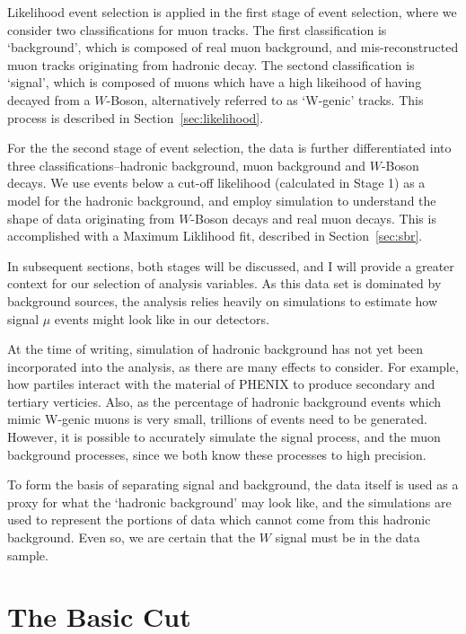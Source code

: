 Likelihood event selection is applied in the first stage of event selection,
where we consider two classifications for muon tracks. The first classification
is `background', which is composed of real muon background, and
mis-reconstructed muon tracks originating from hadronic decay. The sectond
classification is `signal', which is composed of muons which have a high
likeihood of having decayed from a $W$-Boson, alternatively referred to as
`W-genic' tracks. This process is described in Section~\ref{sec:likelihood}.

For the the second stage of event selection, the data is further differentiated
into three classifications--hadronic background, muon background and $W$-Boson
decays. We use events below a cut-off likelihood (calculated in Stage 1) as a
model for the hadronic background, and employ simulation to understand the shape
of data originating from $W$-Boson decays and real muon decays. This is
accomplished with a Maximum Liklihood fit, described in Section~\ref{sec:sbr}.

In subsequent sections, both stages will be discussed, and I will provide a
greater context for our selection of analysis variables. As this data set is
dominated by background sources, the analysis relies heavily on simulations to
estimate how signal $\mu$ events might look like in our detectors. 

At the time of writing, simulation of hadronic background has not yet been
incorporated into the analysis, as there are many effects to consider. For
example, how partiles interact with the material of PHENIX to produce secondary
and tertiary verticies. Also, as the percentage of hadronic background events
which mimic W-genic muons is very small, trillions of events need to be
generated. However, it is possible to accurately simulate the signal process,
and the muon background processes, since we both know these processes to high
precision.

To form the basis of separating signal and background, the data itself is used
as a proxy for what the `hadronic background' may look like, and the simulations
are used to represent the portions of data which cannot come from this hadronic
background. Even so, we are certain that the $W$ signal must be in the data
sample.

\clearpage
\section{The Basic Cut}
\label{sec:basic_cut}

